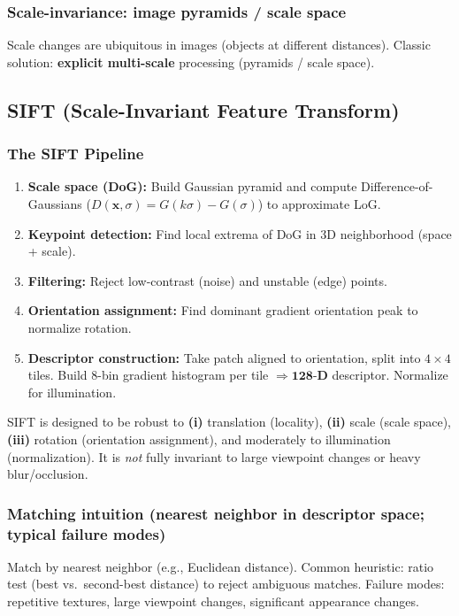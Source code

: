 \documentclass[11pt,a4paper]{article}
\newcommand{\vct}[1]{\bm{#1}}
\begin{document}
\subsubsection{Scale-invariance: image pyramids / scale space}
Scale changes are ubiquitous in images (objects at different distances).
Classic solution: \textbf{explicit multi-scale} processing (pyramids / scale space).

\subsection{SIFT (Scale-Invariant Feature Transform)}
\subsubsection{The SIFT Pipeline}
\begin{enumerate}
  \item \textbf{Scale space (DoG):} Build Gaussian pyramid and compute Difference-of-Gaussians ($D(\vct{x},\sigma)=G(k\sigma)-G(\sigma)$) to approximate LoG.
  \item \textbf{Keypoint detection:} Find local extrema of DoG in 3D neighborhood (space + scale).
  \item \textbf{Filtering:} Reject low-contrast (noise) and unstable (edge) points.
  \item \textbf{Orientation assignment:} Find dominant gradient orientation peak to normalize rotation.
  \item \textbf{Descriptor construction:} Take patch aligned to orientation, split into $4\times4$ tiles. Build 8-bin gradient histogram per tile $\Rightarrow \mathbf{128\text{-D}}$ descriptor. Normalize for illumination.
  
\end{enumerate}
\begin{qbox}
SIFT is designed to be robust to \textbf{(i)} translation (locality), \textbf{(ii)} scale (scale space),
\textbf{(iii)} rotation (orientation assignment), and moderately to illumination (normalization).
It is \emph{not} fully invariant to large viewpoint changes or heavy blur/occlusion.
\end{qbox}

\subsubsection{Matching intuition (nearest neighbor in descriptor space; typical failure modes)}
Match by nearest neighbor (e.g., Euclidean distance).
Common heuristic: ratio test (best vs.\ second-best distance) to reject ambiguous matches.
Failure modes: repetitive textures, large viewpoint changes, significant appearance changes.
\end{document}
